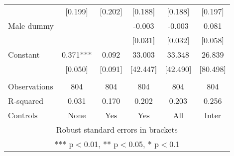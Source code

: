 \begin{tabular}{lccccc}
 & [0.199] & [0.202] & [0.188] & [0.188] & [0.197] \\
Male dummy &  &  & -0.003 & -0.003 & 0.081 \\
 &  &  & [0.031] & [0.032] & [0.058] \\
Constant & 0.371*** & 0.092 & 33.003 & 33.348 & 26.839 \\
 & [0.050] & [0.091] & [42.447] & [42.490] & [80.498] \\
 &  &  &  &  &  \\
Observations & 804 & 804 & 804 & 804 & 804 \\
R-squared & 0.031 & 0.170 & 0.202 & 0.203 & 0.256 \\
 Controls & None & Yes & Yes & All & Inter \\ \hline
\multicolumn{6}{c}{ Robust standard errors in brackets} \\
\multicolumn{6}{c}{ *** p$<$0.01, ** p$<$0.05, * p$<$0.1} \\
\end{tabular}

